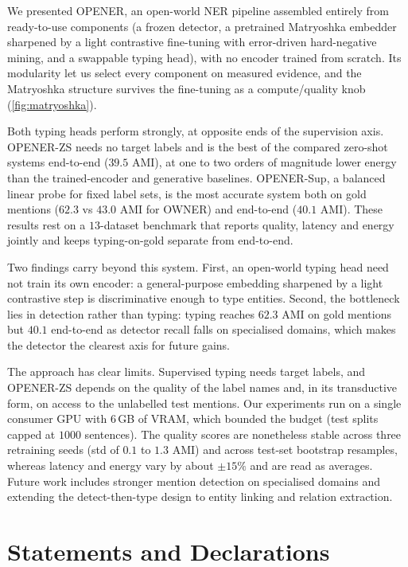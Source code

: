 \documentclass[pdflatex,sn-basic,Numbered]{sn-jnl}
\begin{document}
{
We presented OPENER, an open-world NER pipeline assembled entirely from ready-to-use components (a frozen detector, a pretrained Matryoshka embedder sharpened by a light contrastive fine-tuning with error-driven hard-negative mining, and a swappable typing head), with no encoder trained from scratch.
Its modularity let us select every component on measured evidence, and the Matryoshka structure survives the fine-tuning as a compute/quality knob (\autoref{fig:matryoshka}).

Both typing heads perform strongly, at opposite ends of the supervision axis.
OPENER-ZS needs no target labels and is the best of the compared zero-shot systems end-to-end ($39.5$ AMI), at one to two orders of magnitude lower energy than the trained-encoder and generative baselines.
OPENER-Sup, a balanced linear probe for fixed label sets, is the most accurate system both on gold mentions ($62.3$ vs $43.0$ AMI for OWNER) and end-to-end ($40.1$ AMI).
These results rest on a $13$-dataset benchmark that reports quality, latency and energy jointly and keeps typing-on-gold separate from end-to-end.

Two findings carry beyond this system.
First, an open-world typing head need not train its own encoder: a general-purpose embedding sharpened by a light contrastive step is discriminative enough to type entities.
Second, the bottleneck lies in detection rather than typing: typing reaches $62.3$ AMI on gold mentions but $40.1$ end-to-end as detector recall falls on specialised domains, which makes the detector the clearest axis for future gains.

The approach has clear limits.
Supervised typing needs target labels, and OPENER-ZS depends on the quality of the label names and, in its transductive form, on access to the unlabelled test mentions.
Our experiments run on a single consumer GPU with $6$\,GB of VRAM, which bounded the budget (test splits capped at $1000$ sentences). The quality scores are nonetheless stable across three retraining seeds (std of $0.1$ to $1.3$ AMI) and across test-set bootstrap resamples, whereas latency and energy vary by about $\pm 15\%$ and are read as averages.
Future work includes stronger mention detection on specialised domains and extending the detect-then-type design to entity linking and relation extraction.
\par}

\backmatter

\section*{Statements and Declarations}
\label{sec:declarations}
\end{document}
